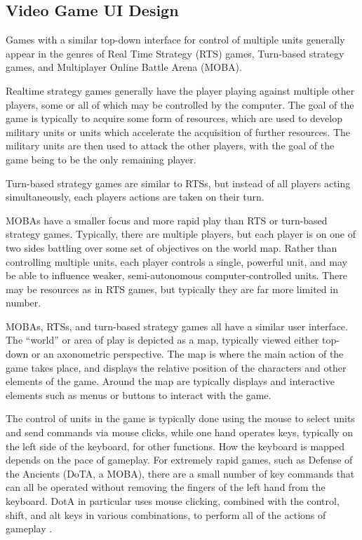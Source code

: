 \subsection{Video Game UI Design}



Games with a similar top-down interface for control of multiple units generally appear in the genres of Real Time Strategy (RTS) games, Turn-based strategy games, and Multiplayer Online Battle Arena (MOBA). 

Realtime strategy games generally have the player playing against multiple other players, some or all of which may be controlled by the computer. 
The goal of the game is typically to acquire some form of resources, which are used to develop military units or units which accelerate the acquisition of further resources. 
The military units are then used to attack the other players, with the goal of the game being to be the only remaining player. 

Turn-based strategy games are similar to RTSs, but instead of all players acting simultaneously, each players actions are taken on their turn. 

MOBAs have a smaller focus and more rapid play than RTS or turn-based strategy games. 
Typically, there are multiple players, but each player is on one of two sides battling over some set of objectives on the world map. 
Rather than controlling multiple units, each player controls a single, powerful unit, and may be able to influence weaker, semi-autonomous computer-controlled units.  There may be resources as in RTS games, but typically they are far more limited in number.   

MOBAs, RTSs, and turn-based strategy games all have a similar user interface. 
The ``world'' or area of play is depicted as a map, typically viewed either top-down or an axonometric perspective. 
The map is where the main action of the game takes place, and displays the relative position of the characters and other elements of the game. 
Around the map are typically displays and interactive elements such as menus or buttons to interact with the game. 

The control of units in the game is typically done using the mouse to select units and send commands via mouse clicks, while one hand operates keys, typically on the left side of the keyboard, for other functions. 
How the keyboard is mapped depends on the pace of gameplay. 
For extremely rapid games, such as Defense of the Ancients (DoTA, a MOBA), there are a small number of key commands that can all be operated without removing the fingers of the left hand from the keyboard. 
DotA in particular uses mouse clicking, combined with the control, shift, and alt keys in various combinations, to perform all of the actions of gameplay . 


